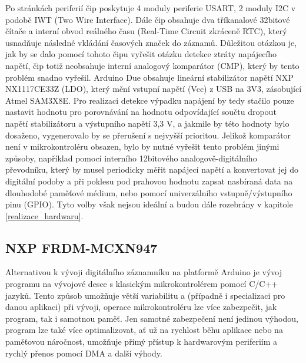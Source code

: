 Po stránkách periferií čip poskytuje 4 moduly periferie USART, 2 moduly I2C v podobě IWT (Two Wire Interface). Dále čip obsahuje dva tříkanalové 32bitové čítače a interní obvod reálného času (Real-Time Circuit zkráceně RTC), který usnadňuje následné vkládání časových značek do záznamů. Důležitou otázkou je, jak by se dalo pomocí tohoto čipu vyřešit otázku detekce ztráty napájecího napětí, čip totiž neobsahuje interní analogový komparátor (CMP), který by tento problém snadno vyřešil. Arduino Due obsahuje lineární stabilizátor napětí NXP NX1117CE33Z (LDO), který mění vstupní napětí (Vcc) z USB na 3V3, zásobující Atmel SAM3X8E. Pro realizaci detekce výpadku napájení by tedy stačilo pouze nastavit hodnotu pro porovnávání na hodnotu odpovídající součtu dropout napětí stabilizátoru a výstupního napětí 3,3 V, a jakmile by této hodnoty bylo dosaženo, vygenerovalo by se přerušení s nejvyšší prioritou. Jelikož komparátor není v mikrokontroléru obsazen, bylo by nutné vyřešit tento problém jinými způsoby, například pomocí interního 12bitového analogově-digitálního převodníku, který by musel periodicky měřit napájecí napětí a konvertovat jej do digitální podoby a při poklesu pod prahovou hodnotu zapsat nasbíraná data na dlouhodobé paměťové médium, nebo pomocí univerzálního vstupně/výstupního pinu (GPIO). Tyto volby však nejsou ideální a budou dále rozebrány v kapitole \ref{realizace_hardwaru}. \cite{arduino_shop_due, nxp_NX1117C_ldo}


\subsection{NXP FRDM-MCXN947}
Alternativou k vývoji digitálního záznamníku na platformě Arduino je vývoj programu na vývojové desce s klasickým mikrokontrolérem pomocí C/C++ jazyků. Tento způsob umožňuje větší variabilitu a (případně i specializaci pro danou aplikaci) při vývoji, operace mikrokontroléru lze více zabezpečit, jak program, tak i samotnou paměť. Jen samotné zabezpečení není jedinou výhodou, program lze také více optimalizovat, ať už na rychlost běhu aplikace nebo na paměťovou náročnost, umožňuje přímý přístup k hardwarovým periferiím a rychlý přenos pomocí DMA a další výhody.

